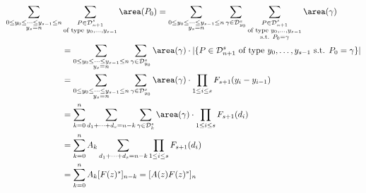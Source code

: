 \documentclass[12pt]{article}
\begin{document}
\begin{align*}
    \sum_{\substack{0\leq y_{0}\leq \cdots\leq y_{s-1}\leq n\\y_{s}=n}}& \sum_{\substack{P\in \mathcal{D}_{n+1}^{s}\\\text{of type }y_{0},\ldots, y_{s-1}}} \area(P_{0}) = \sum_{\substack{0\leq y_{0}\leq \cdots\leq y_{s-1}\leq n\\y_{s}=n}} \sum_{\gamma\in \mathcal{D}_{y_{0}}^{s}} \sum_{\substack{P\in \mathcal{D}_{n+1}^{s}\\\text{of type }y_{0},\ldots, y_{s-1}\\ \text{s.t. } P_{0} = \gamma}} \area(\gamma)\\
    &= \sum_{\substack{0\leq y_{0}\leq \cdots\leq y_{s-1}\leq n\\y_{s}=n}} \sum_{\gamma\in \mathcal{D}_{y_{0}}^{s}}  \area(\gamma)\cdot |\{P\in \mathcal{D}_{n+1}^{s} \text{ of type }y_{0},\ldots, y_{s-1} \text{ s.t. } P_{0} = \gamma\}|\\
    &= \sum_{\substack{0\leq y_{0}\leq \cdots\leq y_{s-1}\leq n\\y_{s}=n}} \sum_{\gamma\in \mathcal{D}_{y_{0}}^{s}}  \area(\gamma)\cdot \prod_{1\leq i\leq s}F_{s+1}(y_{i}-y_{i-1})\\
    &= \sum_{k=0}^{n}\sum_{d_{1}+\cdots+d_{s}=n-k} \sum_{\gamma\in \mathcal{D}_{k}^{s}}  \area(\gamma)\cdot \prod_{1\leq i\leq s}F_{s+1}(d_{i})\\
    &= \sum_{k=0}^{n}A_{k}\sum_{d_{1}+\cdots+d_{s}=n-k}  \prod_{1\leq i\leq s}F_{s+1}(d_{i}) \\
    &= \sum_{k=0}^{n}A_{k}[F(z)^{s}]_{n-k} = [A(z)F(z)^{s}]_{n}\\
\end{align*}

%
%
\end{document}

